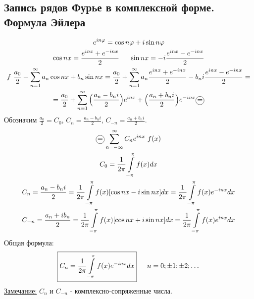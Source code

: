 \documentclass[12pt]{article}
\newcommand*\circled[1]{\tikz[baseline=(char.base)]{
    \node[shape=circle, draw, inner sep=1pt, 
        minimum height=12pt] (char) {#1};}}
\let\oldint\int
\let\oldsum\sum
\renewcommand{\int}{\oldint\limits}
\renewcommand{\sum}{\oldsum\limits}
\begin{document}
    \subsection{Запись рядов Фурье в комплексной форме. Формула Эйлера}
    \begin{gather*}
      e^{in\varphi} = \cos n \varphi + i \sin n \varphi\\
      \cos nx = \frac{e^{inx} + e^{-inx}}{2} \indent \sin nx = -i\frac{e^{inx} - e^{-inx}}{2}\\
      f ~ \frac{a_0}{2} + \sum_{n=1}^{\infty} a_n \cos nx + b_n \sin nx = \frac{a_0}{2} + \sum_{n=1}^{\infty} a_n \frac{e^{inx} + e^{-inx}}{2} - b_n i \frac{e^{inx} - e^{-inx}}{2} =\\
      = \frac{a_0}{2} + \sum_{n=1}^{\infty} \Big(\frac{a_n - b_n i}{2}\Big)e^{inx} + \Big(\frac{a_n + b_n i}{2}\Big)e^{-inx} \circled{=}
    \end{gather*}
    Обозначим $\frac{a_0}{2} = C_0$, $C_n = \frac{a_n - b_n i}{2}$, $C_{-n} = \frac{a_n + b_n i}{2}$.
    \begin{gather*}
      \circled{=} \sum_{n=-\infty}^{\infty} C_n e^{inx} ~ f(x)\\
      C_0 = \frac{1}{2\pi} \int_{-\pi}^{\pi} f(x) dx\\
      C_n = \frac{a_n - b_n i}{2} = \frac{1}{2\pi} \int_{-\pi}^{\pi} f(x) [ \cos nx - i \sin nx ]dx = \frac{1}{2\pi} \int_{-\pi}^{\pi} f(x)e^{-inx}dx\\
      C_{-n} = \frac{a_n + i b_n}{2} = \frac{1}{2\pi}\int_{-\pi}^{\pi} f(x)[\cos nx + i \sin nx]dx = \frac{1}{2\pi} \int_{-\pi}^{\pi} f(x) e^{inx}dx
    \end{gather*}
    Общая формула:
    \[ \boxed{C_n = \frac{1}{2\pi} \int_{-\pi}^{\pi} f(x) e^{-inx}dx} \indent n = 0; \pm 1; \pm 2; \dots \]
    \underline{Замечание:} $C_n$ и $C_{-n}$ - комплексно-сопряженные числа.
  
\end{document}
